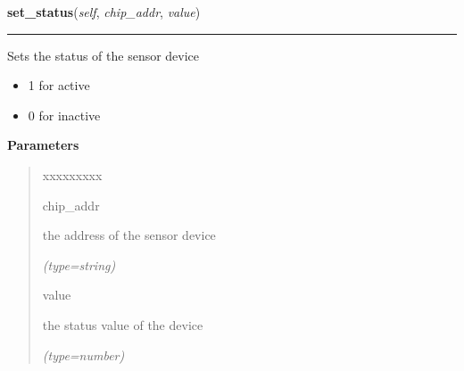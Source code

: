     \label{DBE:DBE:set_status}

    \vspace{0.5ex}

\hspace{.8\funcindent}\begin{boxedminipage}{\funcwidth}

    \raggedright \textbf{set\_status}(\textit{self}, \textit{chip\_addr}, \textit{value})

    \vspace{-1.5ex}

    \rule{\textwidth}{0.5\fboxrule}
\setlength{\parskip}{2ex}
    Sets the status of the sensor device

    \begin{itemize}
    \setlength{\parskip}{0.6ex}
      \item 1 for active

      \item 0 for inactive

    \end{itemize}

\setlength{\parskip}{1ex}
      \textbf{Parameters}
      \vspace{-1ex}

      \begin{quote}
        \begin{Ventry}{xxxxxxxxx}

          \item[chip\_addr]

          the address of the sensor device

            {\it (type=string)}

          \item[value]

          the status value of the device

            {\it (type=number)}

        \end{Ventry}

      \end{quote}

    \end{boxedminipage}

    \label{DBE:DBE:set_user_settings}

    \vspace{0.5ex}

